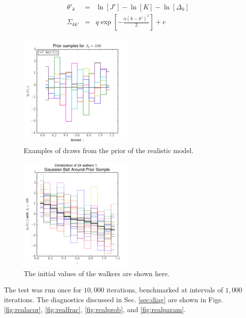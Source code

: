 \documentclass[preprint]{aastex}
\begin{document}
\begin{eqnarray}
\label{eq:covmat}
\theta'_{k} &=& \ln[J']-\ln[K]-\ln[\Delta_{k}]\\
\Sigma_{kk'} &=& q\exp\left[-\frac{a(k-k')^{2}}{2}\right]+e
\end{eqnarray}

\begin{figure}
\includegraphics[width=0.5\textwidth]{real/priorsamps.png}
\caption{Examples of draws from the prior of the realistic model.}
\label{fig:realprior}
\end{figure}

\begin{figure}
\includegraphics[width=0.5\textwidth]{real/initializations.png}
\caption{The initial values of the walkers are shown here.}
\label{fig:realival}
\end{figure}

The test was run once for $10,000$ iterations, benchmarked at intervals of $1,000$ iterations.  The diagnostics discussed in Sec. \ref{sec:diag} are shown in Figs. \ref{fig:realacor}, \ref{fig:realfrac}, \ref{fig:realprob}, and \ref{fig:realparam}.
\end{document}
